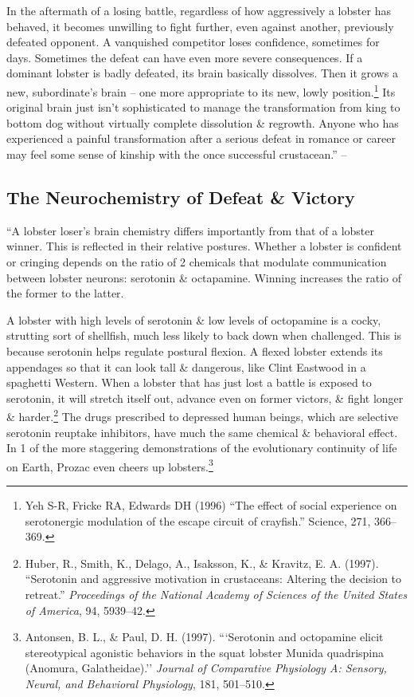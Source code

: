 \documentclass[oneside]{book}
\numberwithin{equation}{section}
\begin{document}
In the aftermath of a losing battle, regardless of how aggressively a lobster has behaved, it becomes unwilling to fight further, even against another, previously defeated opponent. A vanquished competitor loses confidence, sometimes for days. Sometimes the defeat can have even more severe consequences. If a dominant lobster is badly defeated, its brain basically dissolves. Then it grows a new, subordinate's brain -- one more appropriate to its new, lowly position.\footnote{Yeh S-R, Fricke RA, Edwards DH (1996) ``The effect of social experience on serotonergic modulation of the escape circuit of crayfish.'' Science, 271, 366--369.} Its original brain just isn't sophisticated to manage the transformation from king to bottom dog without virtually complete dissolution \& regrowth. Anyone who has experienced a painful transformation after a serious defeat in romance or career may feel some sense of kinship with the once successful crustacean.'' -- \cite[pp. 34--36]{Peterson2018}

\subsection{The Neurochemistry of Defeat \& Victory}
``A lobster loser's brain chemistry differs importantly from that of a lobster winner. This is reflected in their relative postures. Whether a lobster is confident or cringing depends on the ratio of 2 chemicals that modulate communication between lobster neurons: serotonin \& octapamine. Winning increases the ratio of the former to the latter.

A lobster with high levels of serotonin \& low levels of octopamine is a cocky, strutting sort of shellfish, much less likely to back down when challenged. This is because serotonin helps regulate postural flexion. A flexed lobster extends its appendages so that it can look tall \& dangerous, like Clint Eastwood in a spaghetti Western. When a lobster that has just lost a battle is exposed to serotonin, it will stretch itself out, advance even on former victors, \& fight longer \& harder.\footnote{Huber, R., Smith, K., Delago, A., Isaksson, K., \& Kravitz, E. A. (1997). ``Serotonin and aggressive motivation in crustaceans: Altering the decision to retreat.'' \textit{Proceedings of the National Academy of Sciences of the United States of America}, 94, 5939--42.} The drugs prescribed to depressed human beings, which are selective serotonin reuptake inhibitors, have much the same chemical \& behavioral effect. In 1 of the more staggering demonstrations of the evolutionary continuity of life on Earth, Prozac even cheers up lobsters.\footnote{Antonsen, B. L., \& Paul, D. H. (1997). ```Serotonin and octopamine elicit stereotypical agonistic behaviors in the squat lobster Munida quadrispina (Anomura, Galatheidae).'' \textit{Journal of Comparative Physiology A: Sensory, Neural, and Behavioral Physiology}, 181, 501--510.}
\end{document}
